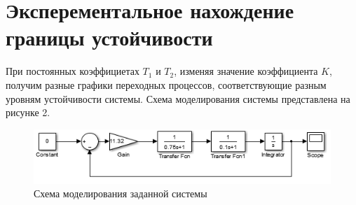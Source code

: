 \documentclass[a4paper, 11pt, russian]{article}
\begin{document}
    \section{Эксперементальное нахождение границы устойчивости}
    При постоянных коэффициетах $T_1$ и $T_2$, изменяя значение коэффициента $K$, получим разные графики переходных процессов, соответствующие разным уровням устойчивости системы. Схема моделирования системы представлена на рисунке 2.
    \begin{figure}[h!]
        \centering
        \includegraphics[scale = 1]{modelScheme.png}
        \caption{Схема моделирования заданной системы}
    \end{figure}
    
\end{document}
